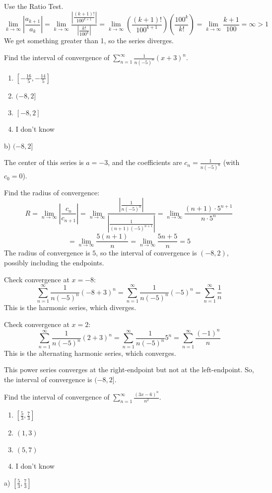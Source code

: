 \documentclass[addpoints,12pt,answers]{exam}
\begin{document}
\begin{questions}
\begin{solution}
    Use the Ratio Test.
    $$\lim_{k\to\infty}\left|\frac{a_{k+1}}{a_k}\right|=\lim_{k\to\infty}\frac{\left|\frac{(k+1)!}{100^{k+1}}\right|}{\left|\frac{k!}{100^k}\right|}=\lim_{k\to\infty}\left(\frac{(k+1)!}{100^{k+1}}\right)\left(\frac{100^k}{k!}\right)=\lim_{k\to\infty}\frac{k+1}{100}=\infty>1$$
    We get something greater than 1, so the series diverges.
  \end{solution}
  \newpage
  \question
  Find the interval of convergence of $\displaystyle\sum_{n=1}^\infty\frac{1}{n(-5)^n}(x+3)^n$.
  \begin{enumerate}[label=\alph*)]
    \item
    $\displaystyle\left[-\frac{16}{5},-\frac{14}{5}\right]$
    \item
    $(-8,2]$
    \item
    $[-8,2]$
    \item
    I don't know
  \end{enumerate}
  \begin{solution}
    b) $(-8,2]$
    
    The center of this series is $a=-3$, and the coefficients are $\displaystyle c_n=\frac{1}{n(-5)^n}$ (with $c_0=0$).
    
    Find the radius of convergence:
    $$R=\lim_{n\to\infty}\left|\frac{c_n}{c_{n+1}}\right|=\lim_{n\to\infty}\frac{\left|\frac{1}{n(-5)^n}\right|}{\left|\frac{1}{(n+1)(-5)^{n+1}}\right|}=\lim_{n\to\infty}\frac{(n+1)\cdot 5^{n+1}}{n\cdot 5^n}$$
    $$=\lim_{n\to\infty}\frac{5(n+1)}{n}=\lim_{n\to\infty}\frac{5n+5}{n}=5$$
    The radius of convergence is $5$, so the interval of convergence is $(-8,2)$, possibly including the endpoints.
    
    Check convergence at $x=-8$:
    $$\sum_{n=1}^\infty\frac{1}{n(-5)^n}(-8+3)^n=\sum_{n=1}^\infty\frac{1}{n(-5)^n}(-5)^n=\sum_{n=1}^\infty\frac{1}{n}$$
    This is the harmonic series, which diverges.
    
    Check convergence at $x=2$:
    $$\sum_{n=1}^\infty\frac{1}{n(-5)^n}(2+3)^n=\sum_{n=1}^\infty\frac{1}{n(-5)^n}5^n=\sum_{n=1}^\infty\frac{(-1)^n}{n}$$
    This is the alternating harmonic series, which converges.
    
    This power series converges at the right-endpoint but not at the left-endpoint. So, the interval of convergence is $(-8,2]$.
  \end{solution}
  \newpage
  \question
  Find the interval of convergence of $\displaystyle\sum_{n=1}^\infty\frac{(3x-6)^n}{n^2}$.
  \begin{enumerate}[label=\alph*)]
    \item
    $\displaystyle\left[\frac{5}{3},\frac{7}{3}\right]$
    \item
    $(1,3)$
    \item
    $(5,7)$
    \item
    I don't know
  \end{enumerate}
  \begin{solution}
    a) $\displaystyle\left[\frac{5}{3},\frac{7}{3}\right]$
    

\end{solution}
\end{questions}
\end{document}
